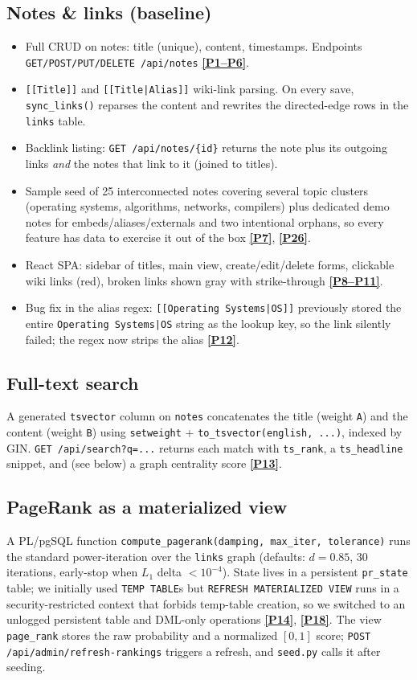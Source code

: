 \documentclass[11pt,a4paper]{article}
\newcommand{\prm}[1]{\href{PROMPT_LOG.md}{\textbf{[P#1]}}}
\newcommand{\prms}[2]{\href{PROMPT_LOG.md}{\textbf{[P#1--P#2]}}}
\begin{document}
\subsection{Notes \& links (baseline)}
\begin{itemize}[leftmargin=1.2em,itemsep=1pt,topsep=2pt]
\item Full CRUD on notes: title (unique), content, timestamps. Endpoints \texttt{GET/POST/PUT/DELETE /api/notes} \prms{1}{6}.
\item \texttt{[[Title]]} and \texttt{[[Title|Alias]]} wiki-link parsing. On every save, \texttt{sync\_links()} reparses the content and rewrites the directed-edge rows in the \texttt{links} table.
\item Backlink listing: \texttt{GET /api/notes/\{id\}} returns the note plus its outgoing links \emph{and} the notes that link to it (joined to titles).
\item Sample seed of 25 interconnected notes covering several topic clusters (operating systems, algorithms, networks, compilers) plus dedicated demo notes for embeds/aliases/externals and two intentional orphans, so every feature has data to exercise it out of the box \prm{7}, \prm{26}.
\item React SPA: sidebar of titles, main view, create/edit/delete forms, clickable wiki links (red), broken links shown gray with strike-through \prms{8}{11}.
\item Bug fix in the alias regex: \texttt{[[Operating Systems|OS]]} previously stored the entire \texttt{Operating Systems|OS} string as the lookup key, so the link silently failed; the regex now strips the alias \prm{12}.
\end{itemize}

\subsection{Full-text search}
A generated \texttt{tsvector} column on \texttt{notes} concatenates the title (weight \texttt{A}) and the content (weight \texttt{B}) using \texttt{setweight} + \texttt{to\_tsvector(\textquotesingle english\textquotesingle, ...)}, indexed by GIN. \texttt{GET /api/search?q=...} returns each match with \texttt{ts\_rank}, a \texttt{ts\_headline} snippet, and (see below) a graph centrality score \prm{13}.

\subsection{PageRank as a materialized view}
A PL/pgSQL function \texttt{compute\_pagerank(damping, max\_iter, tolerance)} runs the standard power-iteration over the \texttt{links} graph (defaults: $d{=}0.85$, 30 iterations, early-stop when $L_1$ delta $<10^{-4}$). State lives in a persistent \texttt{pr\_state} table; we initially used \texttt{TEMP TABLE}s but \texttt{REFRESH MATERIALIZED VIEW} runs in a security-restricted context that forbids temp-table creation, so we switched to an unlogged persistent table and DML-only operations \prm{14}, \prm{18}. The view \texttt{page\_rank} stores the raw probability and a normalized $[0,1]$ score; \texttt{POST /api/admin/refresh-rankings} triggers a refresh, and \texttt{seed.py} calls it after seeding.
\end{document}
